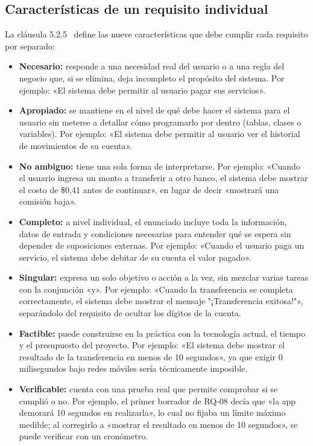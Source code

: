 \documentclass[11pt,a4paper]{article}
\begin{document}
\subsection{Características de un requisito individual}
La cláusula 5.2.5~\cite{iso29148} define las nueve características que debe cumplir cada requisito por separado:
\begin{itemize}
  \item \textbf{Necesario:} responde a una necesidad real del usuario o a una regla del negocio que, si se elimina, deja incompleto el propósito del sistema. Por ejemplo: «El sistema debe permitir al usuario pagar sus servicios».
  \item \textbf{Apropiado:} se mantiene en el nivel de qué debe hacer el sistema para el usuario sin meterse a detallar cómo programarlo por dentro (tablas, clases o variables). Por ejemplo: «El sistema debe permitir al usuario ver el historial de movimientos de su cuenta».
  \item \textbf{No ambiguo:} tiene una sola forma de interpretarse. Por ejemplo: «Cuando el usuario ingresa un monto a transferir a otro banco, el sistema debe mostrar el costo de \$0{,}41 antes de continuar», en lugar de decir «mostrará una comisión baja».
  \item \textbf{Completo:} a nivel individual, el enunciado incluye toda la información, datos de entrada y condiciones necesarias para entender qué se espera sin depender de suposiciones externas. Por ejemplo: «Cuando el usuario paga un servicio, el sistema debe debitar de su cuenta el valor pagado».
  \item \textbf{Singular:} expresa un solo objetivo o acción a la vez, sin mezclar varias tareas con la conjunción «y». Por ejemplo: «Cuando la transferencia se completa correctamente, el sistema debe mostrar el mensaje "¡Transferencia exitosa!"», separándolo del requisito de ocultar los dígitos de la cuenta.
  \item \textbf{Factible:} puede construirse en la práctica con la tecnología actual, el tiempo y el presupuesto del proyecto. Por ejemplo: «El sistema debe mostrar el resultado de la transferencia en menos de 10 segundos», ya que exigir 0 milisegundos bajo redes móviles sería técnicamente imposible.
  \item \textbf{Verificable:} cuenta con una prueba real que permite comprobar si se cumplió o no. Por ejemplo, el primer borrador de RQ-08 decía que «la app demorará 10 segundos en realizarla», lo cual no fijaba un límite máximo medible; al corregirlo a «mostrar el resultado en menos de 10 segundos», se puede verificar con un cronómetro.

\end{itemize}
\end{document}
